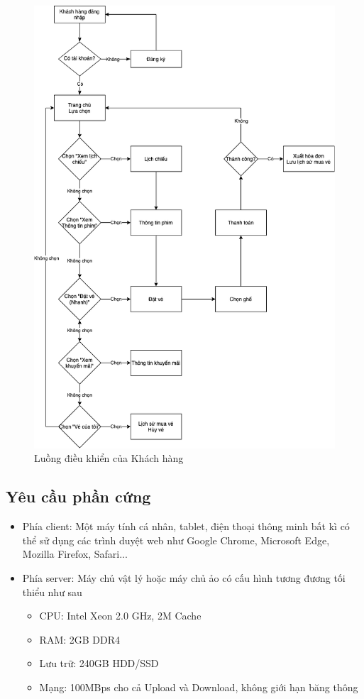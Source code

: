 \documentclass[a4paper, 12pt]{article}
\begin{document}
\begin{figure}[H]
	\begin{center}
		\includegraphics[scale = 0.6]{GCF Charts/GCF_User.png}
		\caption{Luồng điều khiển của Khách hàng}
	\end{center}
\end{figure}

\subsection{Yêu cầu phần cứng}

\begin{itemize}
	\item Phía client: Một máy tính cá nhân, tablet, điện thoại thông minh bất kì có thể sử dụng các trình duyệt web như Google Chrome, Microsoft Edge, Mozilla Firefox, Safari...
	\item Phía server: Máy chủ vật lý hoặc máy chủ ảo có cấu hình tương đương tối thiểu như sau
	\begin{itemize}
		\item CPU: Intel Xeon 2.0 GHz, 2M Cache
		\item RAM: 2GB DDR4
		\item Lưu trữ: 240GB HDD/SSD
		\item Mạng: 100MBps cho cả Upload và Download, không giới hạn băng thông 
	\end{itemize}
\end{itemize}
\clearpage
\end{document}
